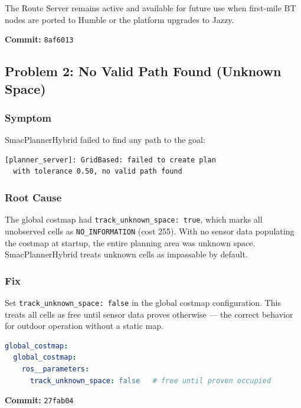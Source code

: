 \documentclass[11pt,a4paper]{article}
\begin{document}
The Route Server remains active and available for future use when first-mile BT nodes are ported to Humble or the platform upgrades to Jazzy.

\textbf{Commit:} \texttt{8af6013}


\subsection{Problem 2: No Valid Path Found (Unknown Space)}

\subsubsection*{Symptom}

SmacPlannerHybrid failed to find any path to the goal:

\begin{lstlisting}[language=bash]
[planner_server]: GridBased: failed to create plan
  with tolerance 0.50, no valid path found
\end{lstlisting}

\subsubsection*{Root Cause}

The global costmap had \texttt{track\_unknown\_space: true}, which marks all unobserved cells as \texttt{NO\_INFORMATION} (cost 255). With no sensor data populating the costmap at startup, the entire planning area was unknown space. SmacPlannerHybrid treats unknown cells as impassable by default.

\subsubsection*{Fix}

Set \texttt{track\_unknown\_space: false} in the global costmap configuration. This treats all cells as free until sensor data proves otherwise --- the correct behavior for outdoor operation without a static map.

\begin{lstlisting}[language=yaml,caption={nav2\_params.yaml --- global\_costmap change}]
global_costmap:
  global_costmap:
    ros__parameters:
      track_unknown_space: false   # free until proven occupied
\end{lstlisting}

\textbf{Commit:} \texttt{27fab04}
\end{document}
